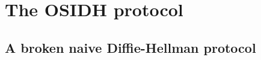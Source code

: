 \documentclass[10pt]{beamer}
\theoremstyle{plain}
\theoremstyle{definition}
\newcommand{\N}{\mathbb{N}}
\newcommand{\Z}{\mathbb{Z}}
\newcommand{\mO}{\mathcal{O}}
\renewcommand{\(}{\left(}
\renewcommand{\)}{\right)}
\newcommand{\mfq}{\mathfrak{q}}
\DeclareMathOperator{\Cl}{Cl}
\begin{document}
\section{The OSIDH protocol}

\subsection{A broken naive Diffie-Hellman protocol}



\end{document}
